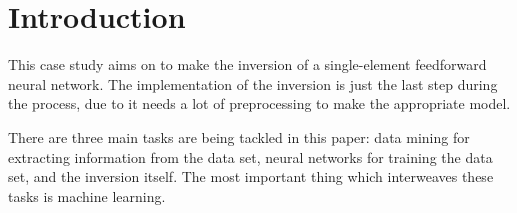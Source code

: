 \chapter{Introduction}

This case study aims on to make the inversion of a single-element feedforward neural network. The implementation of the inversion is just the last step during the process, due to it needs a lot of preprocessing to make the appropriate model.

There are three main tasks are being tackled in this paper: data mining for extracting information from the data set, neural networks for training the data set, and the inversion itself. The most important thing which interweaves these tasks is machine learning. 